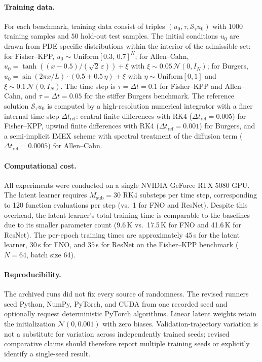 \documentclass[hidelinks,review,nohypdvips,onefignum,onetabnum]{siamart220329}
\newcommand{\cS}{\mathcal{S}}
\newcommand{\cN}{\mathcal{N}}
\begin{document}
\paragraph{Training data.}
For each benchmark, training data consist of triples $(u_0,\tau,\cS_{\tau}u_0)$ with $1000$ training samples and $50$ hold-out test samples.
The initial conditions $u_0$ are drawn from PDE-specific distributions within the interior of the admissible set: for Fisher--KPP, $u_0\sim\mathrm{Uniform}[0.3,\,0.7]^N$; for Allen--Cahn, $u_0=\tanh((x-0.5)/(\sqrt{2}\,\varepsilon))+\xi$ with $\xi\sim 0.05\,\cN(0,I_N)$; for Burgers, $u_0=\sin(2\pi x/L)\cdot(0.5+0.5\,\eta)+\xi$ with $\eta\sim\mathrm{Uniform}[0,1]$ and $\xi\sim 0.1\,\cN(0,I_N)$.
The time step is $\tau=\Delta t=0.1$ for Fisher--KPP and Allen--Cahn, and $\tau=\Delta t=0.05$ for the stiffer Burgers benchmark.
The reference solution $\cS_{\tau}u_0$ is computed by a high-resolution numerical integrator with a finer internal time step $\Delta t_{\mathrm{ref}}$: central finite differences with RK4 ($\Delta t_{\mathrm{ref}}=0.005$) for Fisher--KPP, upwind finite differences with RK4 ($\Delta t_{\mathrm{ref}}=0.001$) for Burgers, and a semi-implicit IMEX scheme with spectral treatment of the diffusion term ($\Delta t_{\mathrm{ref}}=0.0005$) for Allen--Cahn.

\paragraph{Computational cost.}
All experiments were conducted on a single NVIDIA GeForce RTX 5080 GPU. The latent learner requires $M_{\mathrm{sub}}=30$ RK4 substeps per time step, corresponding to 120 function evaluations per step (vs.\ 1 for FNO and ResNet). Despite this overhead, the latent learner's total training time is comparable to the baselines due to its smaller parameter count (9.6\,K vs.\ 17.5\,K for FNO and 41.6\,K for ResNet). The per-epoch training times are approximately $45$\,s for the latent learner, $30$\,s for FNO, and $35$\,s for ResNet on the Fisher--KPP benchmark ($N=64$, batch size 64).

\paragraph{Reproducibility.}
The archived runs did not fix every source of randomness. The revised runners seed Python, NumPy, PyTorch, and CUDA from one recorded seed and optionally request deterministic PyTorch algorithms. Linear latent weights retain the initialization $\mathcal{N}(0,0.001)$ with zero biases. Validation-trajectory variation is not a substitute for variation across independently trained seeds; revised comparative claims should therefore report multiple training seeds or explicitly identify a single-seed result.
\end{document}

